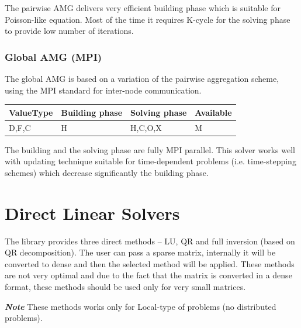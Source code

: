 The pairwise AMG delivers very efficient building phase which is suitable for Poisson-like equation. Most of the time it requires K-cycle for the solving phase to provide low number of iterations.

\subsubsection{Global AMG (MPI)}

The global AMG is based on a variation of the pairwise aggregation scheme, using the MPI standard for inter-node communication.

\begin{table}[H]
\begin{tabular}{l|l|l|l}
\multicolumn{1}{c|}{ValueType} & Building phase & Solving phase & Available \\ \hline
D,F,C                          & H              & H,C,O,X       & M      
\end{tabular}
\end{table}

The building and the solving phase are fully MPI parallel. This solver works well with updating technique suitable for time-dependent problems (i.e. time-stepping schemes) which decrease significantly the building phase.


\section{Direct Linear Solvers}

The library provides three direct methods -- LU, QR and full inversion (based on QR decomposition). The user can pass a sparse matrix, internally it will be converted to dense and then the selected method will be applied. These methods are not very optimal and due to the fact that the matrix is converted in a dense format, these methods should be used only for very small matrices.



\textbf{\emph{Note}} These methods works only for Local-type of problems (no distributed problems).
